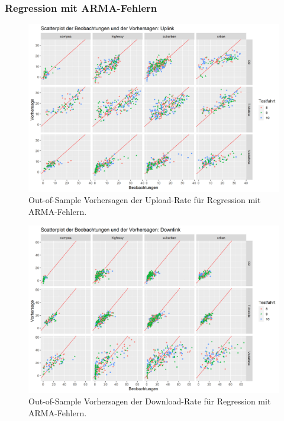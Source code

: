 \subsubsection{Regression mit ARMA-Fehlern}

\begin{figure}
    \centering
    \includegraphics[width=\textwidth]{abbildungen/arma_predictions_ul}
    \caption{Out-of-Sample Vorhersagen der Upload-Rate f\"ur Regression mit ARMA-Fehlern.}
    \label{fig:arma-ul}
\end{figure}

\begin{figure}
    \centering
    \includegraphics[width=\textwidth]{abbildungen/arma_predictions_dl}
    \caption{Out-of-Sample Vorhersagen der Download-Rate f\"ur Regression mit ARMA-Fehlern.}
    \label{fig:arma-dl}
\end{figure}


